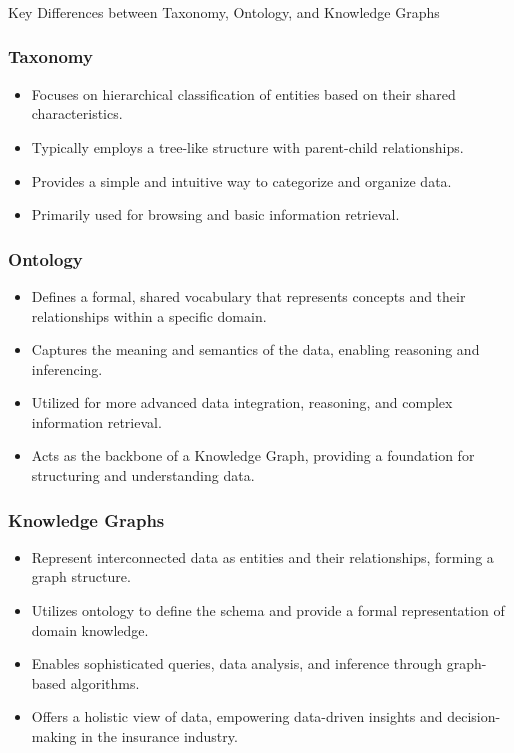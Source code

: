 \begin{frame}[fragile]\frametitle{}
\begin{center}
{\Large Key Differences between Taxonomy, Ontology, and Knowledge Graphs }
\end{center}
\end{frame}


\begin{frame}[fragile]
\frametitle{Taxonomy}

\begin{itemize}
\item Focuses on hierarchical classification of entities based on their shared characteristics.
\item Typically employs a tree-like structure with parent-child relationships.
\item Provides a simple and intuitive way to categorize and organize data.
\item Primarily used for browsing and basic information retrieval.
\end{itemize}
\end{frame}

\begin{frame}[fragile]
\frametitle{Ontology}
\begin{itemize}
\item Defines a formal, shared vocabulary that represents concepts and their relationships within a specific domain.
\item Captures the meaning and semantics of the data, enabling reasoning and inferencing.
\item Utilized for more advanced data integration, reasoning, and complex information retrieval.
\item Acts as the backbone of a Knowledge Graph, providing a foundation for structuring and understanding data.
\end{itemize}
\end{frame}


\begin{frame}[fragile]
\frametitle{Knowledge Graphs}
\begin{itemize}
\item Represent interconnected data as entities and their relationships, forming a graph structure.
\item Utilizes ontology to define the schema and provide a formal representation of domain knowledge.
\item Enables sophisticated queries, data analysis, and inference through graph-based algorithms.
\item Offers a holistic view of data, empowering data-driven insights and decision-making in the insurance industry.
\end{itemize}
\end{frame}

